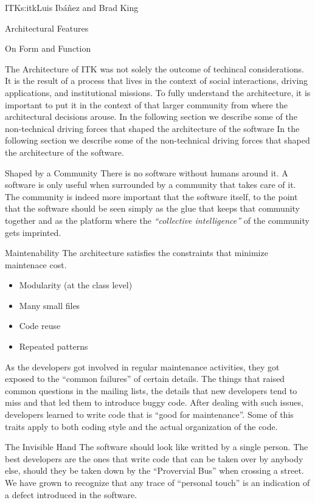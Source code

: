 \begin{aosachapter}{ITK}{s:itk}{Luis Ib\'{a}\~{n}ez and Brad King}
\begin{aosasect1}{Architectural Features}
\end{aosasect1}

\begin{aosasect1}{On Form and Function}

The Architecture of ITK was not solely the outcome of techincal
considerations. It is the result of a process that lives in the
context of social interactions, driving applications, and
institutional missions. To fully understand the architecture, it is
important to put it in the context of that larger community from where
the architectural decisions arouse. In the following section we
describe some of the non-technical driving forces that shaped the
architecture of the software In the following section we describe some
of the non-technical driving forces that shaped the architecture of
the software.

\begin{aosasect2}{Shaped by a Community}
There is no software without humans around it. A software is only
useful when surrounded by a community that takes care of it. The
community is indeed more important that the software itself, to the
point that the software should be seen simply as the glue that keeps
that community together and as the platform where the \emph{``collective
intelligence''} of the community gets imprinted.
\end{aosasect2}

\begin{aosasect2}{Maintenability}
The architecture satisfies the constraints that minimize maintenace cost.
\begin{itemize}
\item Modularity (at the class level)
\item Many small files
\item Code reuse
\item Repeated patterns
\end{itemize}
\end{aosasect2}
As the developers got involved in regular maintenance activities, they
got exposed to the ``common failures'' of certain details. The things
that raised common questions in the mailing lists, the details that
new developers tend to miss and that led them to introduce buggy code.
After dealing with such issues, developers learned to write code that
is ``good for maintenance''. Some of this traits apply to both coding
style and the actual organization of the code.

\begin{aosasect2}{The Invisible Hand}
The software should look like writted by a single person. The best
developers are the ones that write code that can be taken over by
anybody else, should they be taken down by the ``Provervial Bus'' when
crossing a street. We have grown to recognize that any trace of
``personal touch'' is an indication of a defect introduced in the
software.
\end{aosasect2}


\end{aosasect1}
\end{aosachapter}

